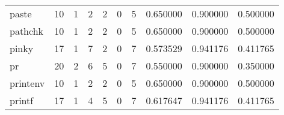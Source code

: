 \begin{longtable}{lrrrrrrrrr}
paste     &                                      10 &                                                  1 &                                                  2 &                                                  2 &                                                  0 &                                                  5 &                                           0.650000 &                               0.900000 &                             0.500000 \\
pathchk   &                                      10 &                                                  1 &                                                  2 &                                                  2 &                                                  0 &                                                  5 &                                           0.650000 &                               0.900000 &                             0.500000 \\
pinky     &                                      17 &                                                  1 &                                                  7 &                                                  2 &                                                  0 &                                                  7 &                                           0.573529 &                               0.941176 &                             0.411765 \\
pr        &                                      20 &                                                  2 &                                                  6 &                                                  5 &                                                  0 &                                                  7 &                                           0.550000 &                               0.900000 &                             0.350000 \\
printenv  &                                      10 &                                                  1 &                                                  2 &                                                  2 &                                                  0 &                                                  5 &                                           0.650000 &                               0.900000 &                             0.500000 \\
printf    &                                      17 &                                                  1 &                                                  4 &                                                  5 &                                                  0 &                                                  7 &                                           0.617647 &                               0.941176 &                             0.411765 \\

\end{longtable}
